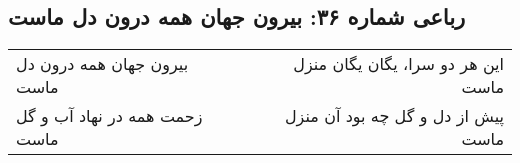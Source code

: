 \begin{center}
\section*{رباعی شماره ۳۶: بیرون جهان همه درون دل ماست}
\label{sec:sh036}
\begin{longtable}{l p{0.5cm} r}
بیرون جهان همه درون دل ماست
&&
این هر دو سرا، یگان یگان منزل ماست
\\
زحمت همه در نهاد آب و گل ماست
&&
پیش از دل و گل چه بود آن منزل ماست
\\
\end{longtable}
\end{center}
